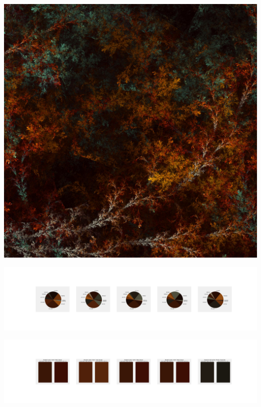 \documentclass[11pt]{article}
\begin{document}
\begin{landscape}
    \begin{center}
    \includegraphics[width=\textwidth]{./nbimg/file (235).jpg}
    \end{center}

    \begin{center}
    \includegraphics[width=250mm]{./nbimg/pie-151.jpg}
    \end{center}

    \begin{center}
    \includegraphics[width=250mm]{./nbimg/peak-151.jpg}
    \end{center}
    


\end{landscape}
\end{document}

